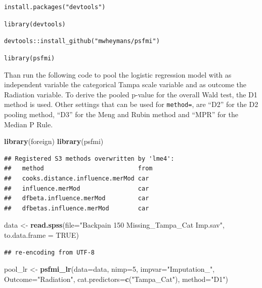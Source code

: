 \documentclass[
]{book}
\newenvironment{Shaded}{\begin{snugshade}}{\end{snugshade}}
\newcommand{\DataTypeTok}[1]{\textcolor[rgb]{0.13,0.29,0.53}{#1}}
\newcommand{\DecValTok}[1]{\textcolor[rgb]{0.00,0.00,0.81}{#1}}
\newcommand{\KeywordTok}[1]{\textcolor[rgb]{0.13,0.29,0.53}{\textbf{#1}}}
\newcommand{\NormalTok}[1]{#1}
\newcommand{\OtherTok}[1]{\textcolor[rgb]{0.56,0.35,0.01}{#1}}
\newcommand{\StringTok}[1]{\textcolor[rgb]{0.31,0.60,0.02}{#1}}
\begin{document}
\texttt{install.packages("devtools")}

\texttt{library(devtools)}

\texttt{devtools::install\_github("mwheymans/psfmi")}

\texttt{library(psfmi)}

Than run the following code to pool the logistic regression model with as independent variable the categorical Tampa scale variable and as outcome the Radiation variable. To derive the pooled p-value for the overall Wald test, the D1 method is used. Other settings that can be used for \texttt{method=}, are ``D2'' for the D2 pooling method, ``D3'' for the Meng and Rubin method and ``MPR'' for the Median P Rule.

\begin{Shaded}
\begin{Highlighting}[]
\KeywordTok{library}\NormalTok{(foreign)}
\KeywordTok{library}\NormalTok{(psfmi)}
\end{Highlighting}
\end{Shaded}

\begin{verbatim}
## Registered S3 methods overwritten by 'lme4':
##   method                          from
##   cooks.distance.influence.merMod car 
##   influence.merMod                car 
##   dfbeta.influence.merMod         car 
##   dfbetas.influence.merMod        car
\end{verbatim}

\begin{Shaded}
\begin{Highlighting}[]
\NormalTok{data <-}\StringTok{ }\KeywordTok{read.spss}\NormalTok{(}\DataTypeTok{file=}\StringTok{"Backpain 150 Missing_Tampa_Cat Imp.sav"}\NormalTok{, }\DataTypeTok{to.data.frame =} \OtherTok{TRUE}\NormalTok{) }
\end{Highlighting}
\end{Shaded}

\begin{verbatim}
## re-encoding from UTF-8
\end{verbatim}

\begin{Shaded}
\begin{Highlighting}[]
\NormalTok{pool_lr <-}\StringTok{ }\KeywordTok{psfmi_lr}\NormalTok{(}\DataTypeTok{data=}\NormalTok{data, }\DataTypeTok{nimp=}\DecValTok{5}\NormalTok{, }\DataTypeTok{impvar=}\StringTok{"Imputation_"}\NormalTok{, }\DataTypeTok{Outcome=}\StringTok{"Radiation"}\NormalTok{,}
  \DataTypeTok{cat.predictors=}\KeywordTok{c}\NormalTok{(}\StringTok{"Tampa_Cat"}\NormalTok{), }\DataTypeTok{method=}\StringTok{"D1"}\NormalTok{)}
\end{Highlighting}
\end{Shaded}
\end{document}
